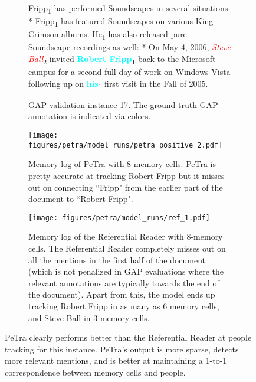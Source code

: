 \documentclass[12pt]{thesis-umich}[thesis]
\newcommand{\hlent}[2]{\colorbox{gray!20}{#1\textsubscript{#2}}}
\begin{document}
\begin{figure}[t]
    \begin{subfigure}[t]{\textwidth}
    \begin{mdframed}
        \hlent{Fripp}{1} has performed Soundscapes in several situations: * \hlent{Fripp}{1} has featured Soundscapes on various King Crimson albums. \hlent{He}{1} has also released pure Soundscape recordings as well: * On May 4, 2006, \hlent{\textcolor{red}{\it Steve Ball}}{2} invited \hlent{\textcolor{aqua}{\bf Robert Fripp}}{1} back to the Microsoft campus for a second full day of work on Windows Vista following up on \hlent{\textcolor{aqua}{\bf his}}{1} first visit in the Fall of 2005.
    \end{mdframed}
    \caption{GAP validation instance 17. The ground truth GAP annotation is indicated via colors.}
    \end{subfigure}
    \centering
    \begin{subfigure}[t]{\textwidth}
    \texttt{[image: figures/petra/model\_runs/petra\_positive\_2.pdf]}
    \caption{Memory log of PeTra with 8-memory cells. PeTra is pretty accurate at tracking Robert Fripp but it misses out on connecting ``Fripp" from the earlier part of the document to ``Robert Fripp". }
    \end{subfigure}
    \begin{subfigure}[t]{\textwidth}
    \texttt{[image: figures/petra/model\_runs/ref\_1.pdf]}
    \caption{Memory log of the Referential Reader with 8-memory cells. The Referential Reader completely misses out on all the mentions in the first half of the document (which is not penalized in GAP evaluations where the relevant annotations are typically towards the end of the document). Apart from this, the model ends up tracking Robert Fripp in as many as 6 memory cells, and Steve Ball in 3 memory cells.}
    \end{subfigure}
    \caption{PeTra clearly performs better than the Referential Reader at people tracking for this instance. PeTra's output is more sparse, detects more relevant mentions, and is better at maintaining a 1-to-1 correspondence between memory cells and people.}
    \label{fig:petra_vs_ref_2}
\end{figure} 
\end{document}
